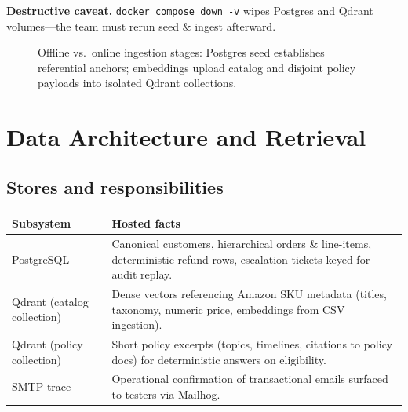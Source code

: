 \documentclass[11pt,a4paper,twoside]{report}
\begin{document}
\textbf{Destructive caveat.} \texttt{docker compose down -v} wipes Postgres and Qdrant volumes—the team must rerun seed \& ingest afterward.

\begin{figure}[htbp]
\centering
{}
\caption{Offline vs.\ online ingestion stages: Postgres seed establishes referential anchors; embeddings upload catalog and disjoint policy payloads into isolated Qdrant collections.}
\label{fig:ops-ingest}
\end{figure}

\chapter{Data Architecture and Retrieval}

\section{Stores and responsibilities}

\begin{tabularx}{\textwidth}{@{} l X @{}}
\toprule
\textbf{Subsystem} & \textbf{Hosted facts}\\
\midrule
PostgreSQL & Canonical customers, hierarchical orders \& line-items, deterministic refund rows, escalation tickets keyed for audit replay.\\
Qdrant (catalog collection) & Dense vectors referencing Amazon SKU metadata (titles, taxonomy, numeric price, embeddings from CSV ingestion).\\
Qdrant (policy collection) & Short policy excerpts (topics, timelines, citations to policy docs) for deterministic answers on eligibility.\\
SMTP trace & Operational confirmation of transactional emails surfaced to testers via Mailhog.\\
\bottomrule
\end{tabularx}
\end{document}
